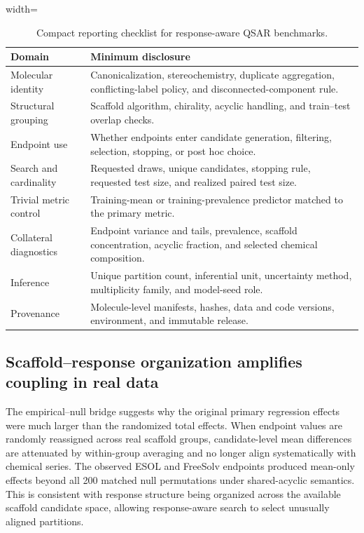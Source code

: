 \begin{table}[!htbp]
\centering
\caption{Compact reporting checklist for response-aware QSAR benchmarks.}
\label{tab:checklist}
\begin{adjustbox}{width=\textwidth}
\begin{tabular}{p{}p{}}
\toprule
Domain & Minimum disclosure \\
\midrule
Molecular identity & Canonicalization, stereochemistry, duplicate aggregation, conflicting-label policy, and disconnected-component rule. \\
Structural grouping & Scaffold algorithm, chirality, acyclic handling, and train--test overlap checks. \\
Endpoint use & Whether endpoints enter candidate generation, filtering, selection, stopping, or post hoc choice. \\
Search and cardinality & Requested draws, unique candidates, stopping rule, requested test size, and realized paired test size. \\
Trivial metric control & Training-mean or training-prevalence predictor matched to the primary metric. \\
Collateral diagnostics & Endpoint variance and tails, prevalence, scaffold concentration, acyclic fraction, and selected chemical composition. \\
Inference & Unique partition count, inferential unit, uncertainty method, multiplicity family, and model-seed role. \\
Provenance & Molecule-level manifests, hashes, data and code versions, environment, and immutable release. \\
\bottomrule
\end{tabular}
\end{adjustbox}
\end{table}

\subsection{Scaffold--response organization amplifies coupling in real data}

The empirical--null bridge suggests why the original primary regression effects were much larger than the randomized total effects. When endpoint values are randomly reassigned across real scaffold groups, candidate-level mean differences are attenuated by within-group averaging and no longer align systematically with chemical series. The observed ESOL and FreeSolv endpoints produced mean-only effects beyond all 200 matched null permutations under shared-acyclic semantics. This is consistent with response structure being organized across the available scaffold candidate space, allowing response-aware search to select unusually aligned partitions.

